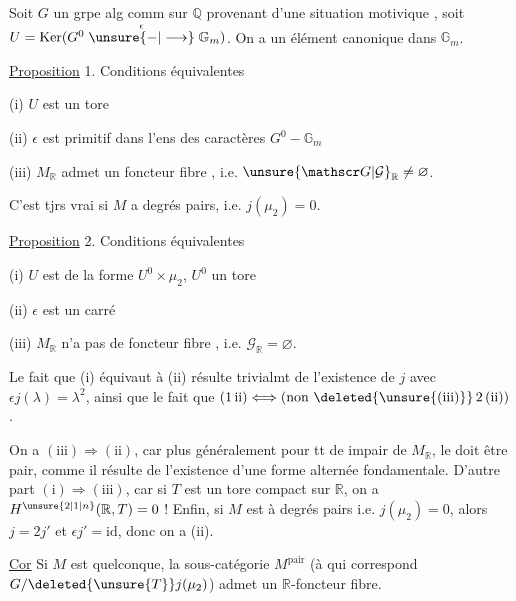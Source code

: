 
Soit $G$ un grpe  alg comm sur $\mathbb Q$ provenant
d'une situation motivique , soit $U=\operatorname{Ker}(G^0\mathrel{\mathop{\unsure{-|\longrightarrow}}\limits^{\epsilon}}\mathbb G_m)$.
On a  un élément canonique dans $\mathbb G_m$.

\uline{Proposition} 1. Conditions équivalentes

(i) $U$ est un tore

(ii) $\epsilon$ est primitif dans l'ens des caractères $G^0\mathrel{-}\mathbb G_m$

(iii) $M_{\mathbb R}$ admet un foncteur fibre , i.e. $\unsure{\mathscr G|\mathcal G}_{\mathbb R}\ne\varnothing$.

C'est tjrs vrai si $M$ a degrés pairs, i.e. $j(\mu_2)=0$.

\uline{Proposition} 2. Conditions équivalentes

(i) $U$ est de la forme $U^0\times\mu_2$, $U^0$ un tore

(ii) $\epsilon$ est  un carré 

(iii) $M_{\mathbb R}$ n'a pas de foncteur fibre , i.e. $\mathscr G_{\mathbb R}=\varnothing$.

Le fait que (i) équivaut à (ii) 
résulte trivialmt de  l'existence de $j$ avec $\epsilon j(\lambda)=\lambda^2$,
ainsi que le fait que $(1\,\mathrm{ii})\Longleftrightarrow(\text{non }\deleted{\unsure{\mathrm{(iii)}}}\,2\,\mathrm{(ii)})$.

On a $(\mathrm{iii})\Rightarrow(\mathrm{ii})$, car plus généralement pour tt
  de   impair de $M_{\mathbb R}$, le  doit
être pair, comme il résulte de l'existence d'une forme alternée fondamentale. D'autre
part $(\mathrm i)\Rightarrow(\mathrm{iii})$, car si $T$ est un tore
compact sur $\mathbb R$, on a $H^{\unsure{2|1|n}}(\mathbb R,T)=0$ ! Enfin, si
$M$ est à degrés pairs i.e. $j(\mu_2)=0$, alors $j=2j'$
 et $\epsilon j'=\mathrm{id}$, donc on a (ii).

\uline{Cor} Si $M$ est quelconque, la sous-catégorie  $M^{\mathrm{pair}}$ 
(à qui correspond $G/\deleted{\unsure{T}}j(\mu_2)$)  admet un
$\mathbb R$-foncteur fibre.


